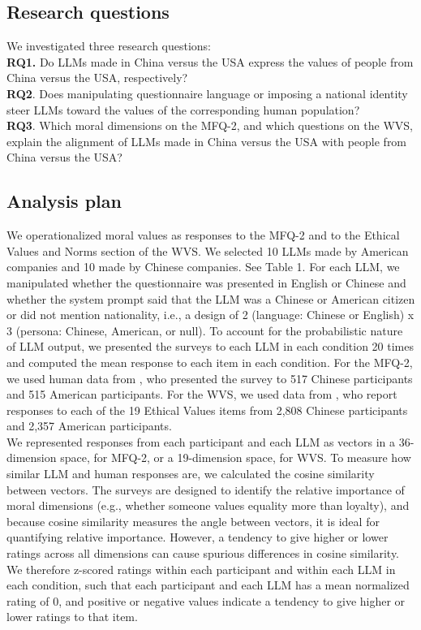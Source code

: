 \documentclass[11pt,a4paper]{article}
\begin{document}
\subsection{Research questions}

We investigated three research questions:\\
 
\noindent\textbf{RQ1.} Do LLMs made in China versus the USA express the values of people from China versus the USA, respectively?\\
\textbf{RQ2}. Does manipulating questionnaire language or imposing a national identity steer LLMs toward the values of the corresponding human population?\\
\textbf{RQ3}. Which moral dimensions on the MFQ-2, and which questions on the WVS, explain the alignment of LLMs made in China versus the USA with people from China versus the USA?

\subsection{Analysis plan}

We operationalized moral values as responses to the MFQ-2 and to the Ethical Values and Norms section of the WVS. We selected 10 LLMs made by American companies and 10 made by Chinese companies. See Table 1. For each LLM, we manipulated whether the questionnaire was presented in English or Chinese and whether the system prompt said that the LLM was a Chinese or American citizen or did not mention nationality, i.e., a design of 2 (language: Chinese or English) x 3 (persona: Chinese, American, or null). To account for the probabilistic nature of LLM output, we presented the surveys to each LLM in each condition 20 times and computed the mean response to each item in each condition. For the MFQ-2, we used human data from \citealp{atari2023morality}, who presented the survey to 517 Chinese participants and 515 American participants. For the WVS, we used data from \citealp{haerpfer2022world}, who report responses to each of the 19 Ethical Values items from 2,808 Chinese participants and 2,357 American participants.\\
\indent We represented responses from each participant and each LLM as vectors in a 36-dimension space, for MFQ-2, or a 19-dimension space, for WVS. To measure how similar LLM and human responses are, we calculated the cosine similarity between vectors. The surveys are designed to identify the relative importance of moral dimensions (e.g., whether someone values equality more than loyalty), and because cosine similarity measures the angle between vectors, it is ideal for quantifying relative importance. However, a tendency to give higher or lower ratings across all dimensions can cause spurious differences in cosine similarity. 
We therefore z-scored ratings within each participant and within each LLM  in each condition, such that each participant and each LLM has a mean normalized rating of 0, and positive or negative values indicate a tendency to give higher or lower ratings to that item.\\
\end{document}
